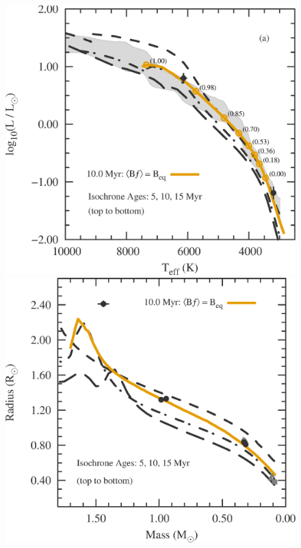 %
%

\begin{figure}
	\centering
    \includegraphics[scale=0.45]{fig/USco_HR_diagram.eps} \hspace{\fill}
    \includegraphics[scale=0.45]{fig/USco_MR_diagram.eps}

\end{figure}
